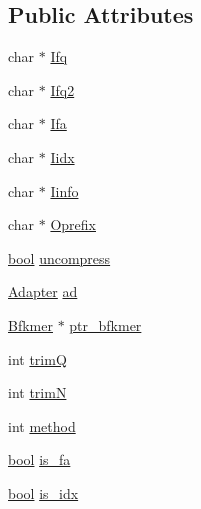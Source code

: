 \subsection*{Public Attributes}
\begin{DoxyCompactItemize}
\item 
char $\ast$ \mbox{\hyperlink{struct__iparam__trimFilter_a5147310738277c148ca7109ba77829ca}{Ifq}}
\item 
char $\ast$ \mbox{\hyperlink{struct__iparam__trimFilter_a5c45337d4d046a995265bd2849ea4785}{Ifq2}}
\item 
char $\ast$ \mbox{\hyperlink{struct__iparam__trimFilter_a55796cd412ef4ca61a5a799d2f64beec}{Ifa}}
\item 
char $\ast$ \mbox{\hyperlink{struct__iparam__trimFilter_a158296e4d37ab3b033c6f9aee1516d71}{Iidx}}
\item 
char $\ast$ \mbox{\hyperlink{struct__iparam__trimFilter_aa1cf61870d64b1e49778dd72312ad707}{Iinfo}}
\item 
char $\ast$ \mbox{\hyperlink{struct__iparam__trimFilter_ad24f2902b532a4ff2dfb1122941064b8}{Oprefix}}
\item 
\mbox{\hyperlink{defines_8h_abb452686968e48b67397da5f97445f5b}{bool}} \mbox{\hyperlink{struct__iparam__trimFilter_a284e4e63e7c10f10a5143d97dcada35c}{uncompress}}
\item 
\mbox{\hyperlink{struct__trimFilter_8h_a3442d07a10a4ab75064687f3c244e370}{Adapter}} \mbox{\hyperlink{struct__iparam__trimFilter_aba4b2762da9029d272905c558986b3f7}{ad}}
\item 
\mbox{\hyperlink{bloom_8h_a4bf3f34a321ce545e533d29ce363f569}{Bfkmer}} $\ast$ \mbox{\hyperlink{struct__iparam__trimFilter_a63b9b54ab69ce2602ec37ececc59e131}{ptr\+\_\+bfkmer}}
\item 
int \mbox{\hyperlink{struct__iparam__trimFilter_a5b5344041c9313230de07c9485227203}{trimQ}}
\item 
int \mbox{\hyperlink{struct__iparam__trimFilter_a5f2d247cc26608ed5cc9e2d6943940d7}{trimN}}
\item 
int \mbox{\hyperlink{struct__iparam__trimFilter_a0b5f9bed4a7b4e2de8c917b42360f4d3}{method}}
\item 
\mbox{\hyperlink{defines_8h_abb452686968e48b67397da5f97445f5b}{bool}} \mbox{\hyperlink{struct__iparam__trimFilter_ac6093d26e41e61f82ffd2aa05f563f9c}{is\+\_\+fa}}
\item 
\mbox{\hyperlink{defines_8h_abb452686968e48b67397da5f97445f5b}{bool}} \mbox{\hyperlink{struct__iparam__trimFilter_afc50c477a3340ed7befc430d273ff6cb}{is\+\_\+idx}}

\end{DoxyCompactItemize}
